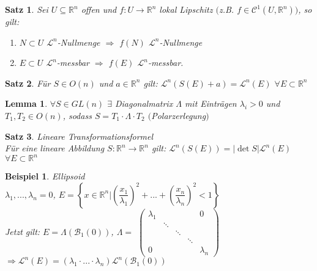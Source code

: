 \documentclass[11pt]{memoir}
\theoremstyle{break}
\newtheorem{Beispiel}{Beispiel}[chapter]
\newtheorem{Lemma}{Lemma}[chapter]
\newtheorem{Satz}{Satz}[chapter]
\begin{document}
\newpage



\begin{Satz}
Sei $U \subseteq \mathbb R^n$ offen und $f: U \rightarrow \mathbb R^n$ lokal Lipschitz $($z.B. $f \in \mathscr C^1(U, \mathbb R^n))$, so gilt:
\begin{enumerate}
	\item $N \subset U$ $\mathscr L^n$-Nullmenge $\Rightarrow$ $f(N)$ $\mathscr L^n$-Nullmenge
	\item $E \subset U$ $\mathscr L^n$-messbar $\Rightarrow$ $f(E)$ $\mathscr L^n$-messbar.
\end{enumerate}
\end{Satz}


\begin{Satz}
Für $S \in O(n)$ und $a \in \mathbb R^n$ gilt: 
$\mathscr L^n (S(E) +a) = \mathscr L^n(E)$ $\forall E \subset \mathbb R^n$
\end{Satz}


\begin{Lemma}
$\forall S \in GL(n)$ $\exists$ Diagonalmatrix $\Lambda$ mit Einträgen $\lambda_i > 0$ und $T_1, T_2 \in O(n)$, sodass $S = T_1\cdotp\Lambda\cdotp T_2$ $($Polarzerlegung$)$
\end{Lemma}


\begin{Satz}
\emph{Lineare Transformationsformel} \\
Für eine lineare Abbildung $S: \mathbb R^n \rightarrow \mathbb R^n$ gilt: $\mathscr L^n(S(E)) = |\det S| \mathscr L^n(E)$ $\forall E \subset \mathbb R^n$
\end{Satz}


\begin{Beispiel}
\emph{Ellipsoid} \\
$\lambda_1, ..., \lambda_n = 0$, $E = \left\{ x \in \mathbb R^n | \left( \dfrac{x_1}{\lambda_1} \right)^2 + ... + \left (\dfrac{x_n}{\lambda_n}\right)^2 < 1 \right\}$ \\
Jetzt gilt: $E = \Lambda(\mathscr B_1(0))$, $\Lambda =$
$\begin{pmatrix}
      \lambda_1 & 	 &	&	& 0 \\
      		 &  	\ddots \\
		 &	& \ddots \\
		 &	&	& \ddots \\
		 0 &	&	&	&	\lambda_n
\end{pmatrix}$
$\Rightarrow \mathscr L^n(E) = (\lambda_1 \cdotp ... \cdotp \lambda_n)\mathscr L^n(\mathscr B_1(0))$
\end{Beispiel}
\end{document}
